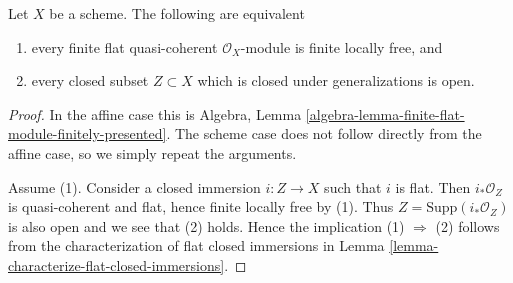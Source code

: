 \begin{lemma}
\label{lemma-finite-flat-is-finite-locally-free}
Let $X$ be a scheme. The following are equivalent
\begin{enumerate}
\item every finite flat quasi-coherent $\mathcal{O}_X$-module is
finite locally free, and
\item every closed subset $Z \subset X$ which is closed under generalizations
is open.
\end{enumerate}
\end{lemma}

\begin{proof}
In the affine case this is
Algebra, Lemma \ref{algebra-lemma-finite-flat-module-finitely-presented}.
The scheme case does not follow directly from the affine case, so we
simply repeat the arguments.

\medskip\noindent
Assume (1). Consider a closed immersion $i : Z \to X$ such that $i$ is flat.
Then $i_*\mathcal{O}_Z$ is quasi-coherent and flat, hence finite locally
free by (1). Thus $Z = \text{Supp}(i_*\mathcal{O}_Z)$ is also open and we see
that (2) holds. Hence the implication (1) $\Rightarrow$ (2) follows from
the characterization of flat closed immersions in
Lemma \ref{lemma-characterize-flat-closed-immersions}.


\end{proof}

